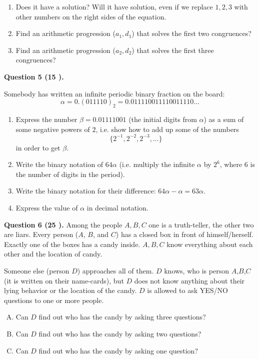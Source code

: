 \documentclass[jou]{apa6}
\begin{document}
\begin{enumerate}
\item Does it have a solution? Will it have solution, even if we replace $1,2,3$ with other numbers
on the right sides of the equation.
\item Find an arithmetic progression ($a_1, d_1$) that solves the first two congruences?
\item Find an arithmetic progression ($a_2, d_2$) that solves the first three congruences?
\end{enumerate}


\vspace{10pt}
{\bf Question 5 (15 \textperthousand{}).}

Somebody has written an infinite periodic binary fraction on the board: 
$$\alpha = 0.(011110)_2 = 0.011110011110011110\ldots$$

\begin{enumerate}
\item Express the number $\beta = 0.01111001$ (the initial digits from $\alpha$) 
as a sum of some negative powers of $2$, i.e. show how to add up some of the numbers
$$\{ 2^{-1}, 2^{-2}, 2^{-3}, \ldots \}$$
in order to get $\beta$. 
\item Write the binary notation of $64\alpha$ (i.e. multiply the infinite $\alpha$ by 
$2^6$, where $6$ is the number of digits in the period). 
\item Write the binary notation for their difference: $64\alpha - \alpha = 63\alpha$. 
\item Express the value of $\alpha$ in decimal notation.
\end{enumerate}



\vspace{10pt}
{\bf Question 6 (25 \textperthousand{}).}
Among the people $A,B,C$ one is a truth-teller, 
the other two are liars. 
Every person ($A$, $B$, and $C$) has a closed box
in front of himself/herself. Exactly one of the 
boxes has a candy inside. $A,B,C$ know everything 
about each other and the location of candy.

Someone else (person $D$) approaches all of them. $D$ knows, who is 
person $A$,$B$,$C$ (it is written on their name-cards), but $D$ does
not know anything about their lying behavior or the location of the candy.
$D$ is allowed to ask YES/NO questions to one or more people.

\begin{enumerate}[(A)]
\item Can $D$ find out who has the candy by asking three questions?
\item Can $D$ find out who has the candy by asking two questions?
\item Can $D$ find out who has the candy by asking one question?
\end{enumerate}
\end{document}
